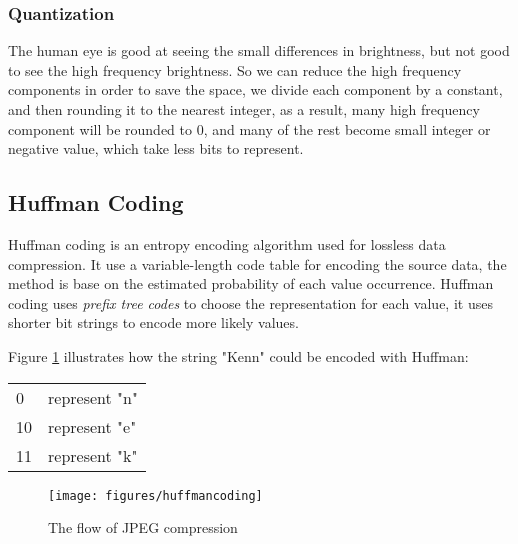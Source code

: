 \subsubsection{Quantization}
The human eye is good at seeing the small differences in brightness, but not good to see the high frequency brightness. So we can reduce the high frequency components in order to save the space, we divide each component by a constant, and then rounding it to the nearest integer, as a result, many high frequency component will be rounded to 0, and many of the rest become small integer or negative value, which take less bits to represent.


\subsection{Huffman Coding}

Huffman coding is an entropy encoding algorithm used for lossless data compression. It use a variable-length code table for encoding the source data, the method is base on the estimated probability of each value occurrence. Huffman coding uses \textit{prefix tree codes} to choose the representation for each value, it uses shorter bit strings to encode more likely values. 

Figure \ref{fig:huffmancoding} illustrates how the string "Kenn" could be encoded with Huffman:


\vspace{0.7em}\begin{tabular}{ll}
0  & represent "n"\\
10 & represent "e"\\
11 & represent "k"\\
\end{tabular}

\begin{figure}[hbt]
  \center
        \texttt{[image: figures/huffmancoding]}
        \caption{The flow of JPEG compression}
  \label{fig:huffmancoding}
\end{figure}



